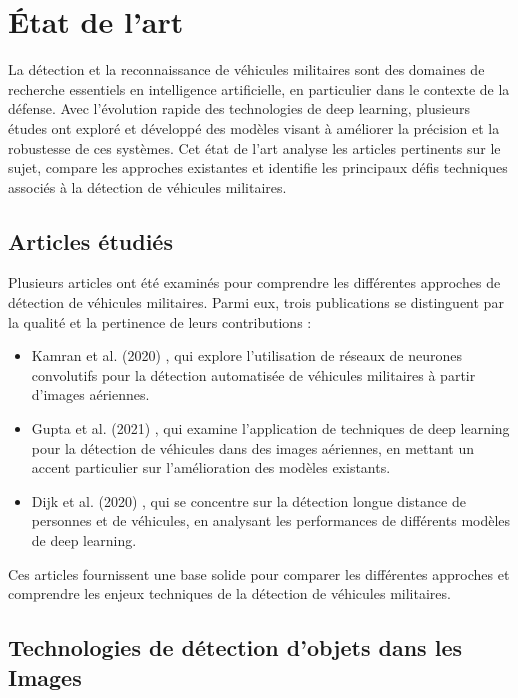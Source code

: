 \chapter{État de l'art}
\label{chap:2}

La détection et la reconnaissance de véhicules militaires sont des domaines de recherche essentiels en intelligence artificielle, en particulier dans le contexte de la défense. Avec l'évolution rapide des technologies de deep learning, plusieurs études ont exploré et développé des modèles visant à améliorer la précision et la robustesse de ces systèmes. Cet état de l'art analyse les articles pertinents sur le sujet, compare les approches existantes et identifie les principaux défis techniques associés à la détection de véhicules militaires.

\section{Articles étudiés}

Plusieurs articles ont été examinés pour comprendre les différentes approches de détection de véhicules militaires. Parmi eux, trois publications se distinguent par la qualité et la pertinence de leurs contributions :

\begin{itemize}
    \item Kamran et al. (2020) \cite{kamran2020}, qui explore l'utilisation de réseaux de neurones convolutifs pour la détection automatisée de véhicules militaires à partir d'images aériennes.
    \item Gupta et al. (2021) \cite{gupta2021}, qui examine l'application de techniques de deep learning pour la détection de véhicules dans des images aériennes, en mettant un accent particulier sur l'amélioration des modèles existants.
    \item Dijk et al. (2020) \cite{spie2020}, qui se concentre sur la détection longue distance de personnes et de véhicules, en analysant les performances de différents modèles de deep learning.
\end{itemize}

Ces articles fournissent une base solide pour comparer les différentes approches et comprendre les enjeux techniques de la détection de véhicules militaires.



\section{Technologies de détection d'objets dans les Images}

